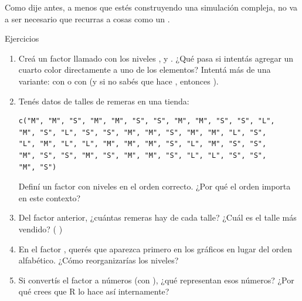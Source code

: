 \documentclass[8pt]{beamer}
\begin{document}
\begin{frame}[fragile]
	Como dije antes, a menos que est\'es construyendo una simulaci\'on compleja, no va a ser necesario que recurras a cosas como un .
\end{frame}




\begin{frame}[fragile]{Ejercicios}
	\begin{enumerate}
		\item Cre\'a un factor llamado  con los niveles  ,   y . ¿Qué pasa si intent\'as agregar un cuarto color   directamente a uno de los elementos? Intent\'a más de una variante: con  o con  (y si no sab\'es que hace , entonces ).
		
		\item Ten\'es datos de talles de remeras en una tienda:
		\begin{lstlisting}[style=RScript, numbers=none]
c("M", "M", "S", "M", "M", "S", "S", "M", "M", "S", "S", "L", 
"M", "S", "L", "S", "S", "M", "M", "S", "M", "M", "L", "S", 
"L", "M", "L", "L", "M", "M", "M", "S", "L", "M", "S", "S", 
"M", "S", "S", "M", "S", "M", "M", "S", "L", "L", "S", "S", 
"M", "S")
\end{lstlisting}
		Defin\'i un factor  con niveles en el orden correcto. ¿Por qué el orden importa en este contexto?
		
		\item Del factor  anterior, ¿cuántas remeras hay de cada talle? ¿Cuál es el talle más vendido? ( )
		
		\item En el factor , querés que   aparezca primero en los gráficos en lugar del orden alfabético. ¿Cómo reorganizarías los niveles?
		
		\item Si convertís el factor  a números (con ), ¿qué representan esos números? ¿Por qué crees que R lo hace así internamente?
	\end{enumerate}
\end{frame}
\end{document}
